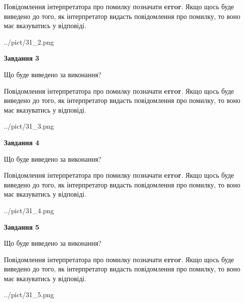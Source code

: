 \documentclass[12pt, ukrainian]{article}
\begin{document}
{\begin {large}
Повідомлення інтерпретатора про помилку позначати \textbf{error}.
Якщо щось буде виведено до того, як інтерпретатор видасть повідомлення про помилку, 
то воно має вказуватись у відповіді. \par


\begin{center}
	{../pict/31_2.png}
\end{center}
\newpage

{\begin {center}\textbf{Завдання 3}\end {center}}\par
Що буде виведено за виконання?

Повідомлення інтерпретатора про помилку позначати \textbf{error}.
Якщо щось буде виведено до того, як інтерпретатор видасть повідомлення про помилку, 
то воно має вказуватись у відповіді. \par


\begin{center}
	{../pict/31_3.png}
\end{center}
\newpage

{\begin {center}\textbf{Завдання 4}\end {center}}\par
Що буде виведено за виконання?

Повідомлення інтерпретатора про помилку позначати \textbf{error}.
Якщо щось буде виведено до того, як інтерпретатор видасть повідомлення про помилку, 
то воно має вказуватись у відповіді. \par


\begin{center}
	{../pict/31_4.png}
\end{center}
\newpage

{\begin {center}\textbf{Завдання 5}\end {center}}\par
Що буде виведено за виконання?

Повідомлення інтерпретатора про помилку позначати \textbf{error}.
Якщо щось буде виведено до того, як інтерпретатор видасть повідомлення про помилку, 
то воно має вказуватись у відповіді. \par


\begin{center}
	{../pict/31_5.png}
\end{center}
\newpage


\end{large}}
\end{document}
